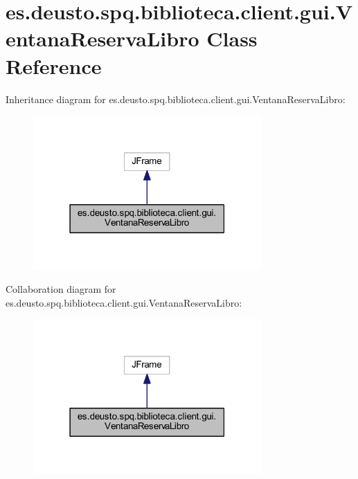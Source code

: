 \hypertarget{classes_1_1deusto_1_1spq_1_1biblioteca_1_1client_1_1gui_1_1_ventana_reserva_libro}{}\section{es.\+deusto.\+spq.\+biblioteca.\+client.\+gui.\+Ventana\+Reserva\+Libro Class Reference}
\label{classes_1_1deusto_1_1spq_1_1biblioteca_1_1client_1_1gui_1_1_ventana_reserva_libro}


Inheritance diagram for es.\+deusto.\+spq.\+biblioteca.\+client.\+gui.\+Ventana\+Reserva\+Libro\+:
\nopagebreak
\begin{figure}[H]
\begin{center}
\leavevmode
\includegraphics[width=247pt]{classes_1_1deusto_1_1spq_1_1biblioteca_1_1client_1_1gui_1_1_ventana_reserva_libro__inherit__graph}
\end{center}
\end{figure}


Collaboration diagram for es.\+deusto.\+spq.\+biblioteca.\+client.\+gui.\+Ventana\+Reserva\+Libro\+:
\nopagebreak
\begin{figure}[H]
\begin{center}
\leavevmode
\includegraphics[width=247pt]{classes_1_1deusto_1_1spq_1_1biblioteca_1_1client_1_1gui_1_1_ventana_reserva_libro__coll__graph}
\end{center}
\end{figure}

